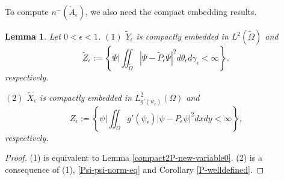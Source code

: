 \documentclass[1 [leqno, 11pt]{amsart}
\numberwithin{equation}{section}
\let\ep=\epsilon
\newtheorem{lemma}[Theorem]{Lemma}
\begin{document}
\begin{CJK*}{GBK}{song}
To compute $n^-(\tilde{A}_\ep)$, we also need the compact embedding results.

\begin{lemma}\label{compact2P-new-variable-ep} Let $0<\ep<1$.
$(1)$ $\tilde Y_\ep$ is compactly embedded in $L^2(\tilde \Omega)$ and
\begin{equation*}
 \tilde Z_{\ep}:=\left\{\Psi\bigg|\iint_{\tilde \Omega}|\Psi-\tilde P_\ep\Psi|^2d\theta_\ep d\gamma_\ep<\infty\right\},
  \end{equation*}
respectively.

$(2)$  $\tilde X_\ep$ is compactly embedded in $L_{g'(\psi_\ep)}^2(\Omega)$ and
 \begin{equation*}
 Z_{\ep}:=\left\{\psi\bigg|\iint_{\Omega}g'(\psi_\ep)|\psi-P_\ep\psi|^2dxdy<\infty\right\},
  \end{equation*}
respectively.
\end{lemma}
\begin{proof}
(1) is equivalent to Lemma \ref{compact2P-new-variable0}. (2) is a consequence of (1), \eqref{Psi-psi-norm-eq} and Corollary \ref{P-welldefined}.
\end{proof}


\end{CJK*}
\end{document}
